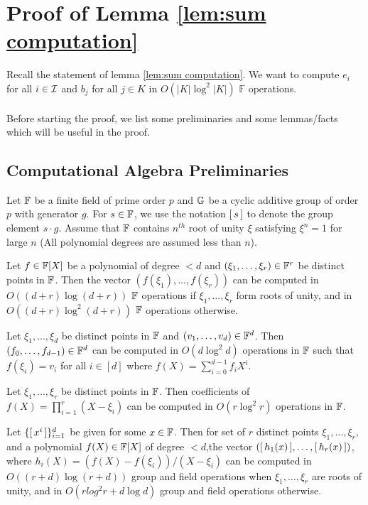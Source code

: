 \section{Proof of Lemma \ref{lem:sum computation}}
Recall the statement of lemma \ref{lem:sum computation}. We want to compute $e_i$ for all $i \in \mathcal{I}$ and $b_j$ for all $j \in K$ in $O(|K|\log^2|K|)$ $\mathbb{F}$ operations.\\\\

Before starting the proof, we list some preliminaries and some lemmas/facts which will be useful in the proof.\\

\subsection{Computational Algebra Preliminaries}
Let $\mathbb{F}$ be a finite field of prime order $p$ and $\mathbb{G}$ be a cyclic additive group of order $p$ with generator $g$. For $s \in \mathbb{F}$, we use
the notation $[\,{s}\,]$ to denote the group element $s\cdot g$. Assume that $\mathbb{F}$ contains $n^{th}$ root of unity $\xi$
satisfying $\xi^n=1$ for large $n$ (All polynomial degrees are assumed less than $n$).

\begin{fact}\label{fc:fft}
Let $f\in \mathbb{F}[X]$ be a polynomial of degree $<d$ and $(\xi_1,\ldots,\xi_r)\in \mathbb{F}^r$ be distinct points in $\mathbb{F}$.
Then the vector $(f(\xi_1),\ldots,f(\xi_r))$ can be computed in $O((d+r)\log (d+r))$ $\mathbb{F}$ operations if $\xi_1,\ldots,\xi_r$ form roots
of unity, and in $O((d+r)\log^2(d+r))$ $\mathbb{F}$ operations otherwise.
\end{fact}

\begin{fact}\label{fc:ifft}
Let $\xi_1,\ldots,\xi_d$ be distinct points in $\mathbb{F}$ and $(v_1,\ldots,v_d)\in \mathbb{F}^d$. Then $(f_0,\ldots,f_{d-1})\in \mathbb{F}^d$
can be computed in $O(d\log^2 d)$ operations in $\mathbb{F}$ such that $f(\xi_i)=v_i$ for all $i\in [d]$ where
$f(X)=\sum_{i=0}^{d-1}f_iX^i$.
\end{fact}

\begin{fact}\label{fc:mult}
Let $\xi_1,\ldots,\xi_r$ be distinct points in $\mathbb{F}$. Then coefficients of $f(X)=\prod_{i=1}^r (X-\xi_i)$
can be computed in $O(r\log^2 r)$ operations in $\mathbb{F}$.
\end{fact}

\begin{fact}\label{fc:multkzg}
Let $\{[\,{x^i}\,]\}_{i=1}^d$ be given for some $x\in \mathbb{F}$. Then for set of $r$ distinct points $\xi_1,\ldots,\xi_r$,
and a polynomial $f(X)\in \mathbb{F}[X]$ of degree $<d$,the vector $([\,{h_1(x)}\,],\ldots,[\,{h_r(x)}\,])$,
where $h_i(X) = (f(X) - f(\xi_i))/(X - \xi_i)$ can be computed in
$O((r+d)\log(r+d))$ group and field operations when $\xi_1,\ldots,\xi_r$ are roots of unity, and in
$O(rlog^2 r + d\log d)$ group and field operations otherwise.
\end{fact}

